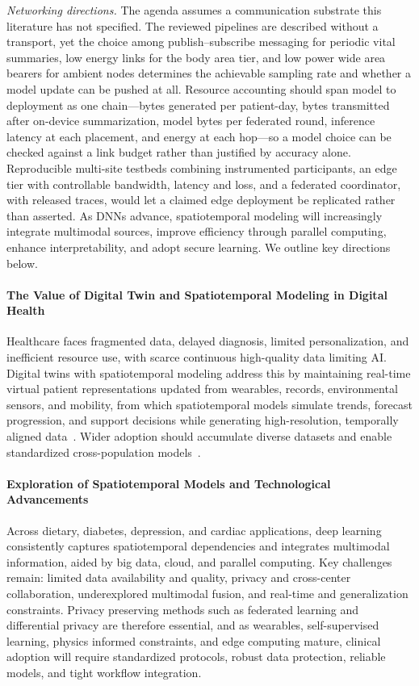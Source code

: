 \documentclass[journal]{IEEEtran}
\begin{document}
\emph{Networking directions.} The agenda assumes a communication substrate this literature has not specified. The reviewed pipelines are described without a transport, yet the choice among publish--subscribe messaging for periodic vital summaries, low energy links for the body area tier, and low power wide area bearers for ambient nodes determines the achievable sampling rate and whether a model update can be pushed at all. Resource accounting should span model to deployment as one chain---bytes generated per patient-day, bytes transmitted after on-device summarization, model bytes per federated round, inference latency at each placement, and energy at each hop---so a model choice can be checked against a link budget rather than justified by accuracy alone. Reproducible multi-site testbeds combining instrumented participants, an edge tier with controllable bandwidth, latency and loss, and a federated coordinator, with released traces, would let a claimed edge deployment be replicated rather than asserted.
\else
As DNNs advance, spatiotemporal modeling will increasingly integrate multimodal sources, improve efficiency through parallel computing, enhance interpretability, and adopt secure learning. We outline key directions below.
\paragraph{The Value of Digital Twin and Spatiotemporal Modeling in Digital Health}

Healthcare faces fragmented data, delayed diagnosis, limited personalization, and inefficient resource use, with scarce continuous high-quality data limiting AI. Digital twins with spatiotemporal modeling address this by maintaining real-time virtual patient representations updated from wearables, records, environmental sensors, and mobility, from which spatiotemporal models simulate trends, forecast progression, and support decisions while generating high-resolution, temporally aligned data~\cite{ali2024spatialtwins}. Wider adoption should accumulate diverse datasets and enable standardized cross-population models~\cite{bilal2025cityseircast}.

\paragraph{Exploration of Spatiotemporal Models and Technological Advancements}

Across dietary, diabetes, depression, and cardiac applications, deep learning consistently captures spatiotemporal dependencies and integrates multimodal information, aided by big data, cloud, and parallel computing. Key challenges remain: limited data availability and quality, privacy and cross-center collaboration, underexplored multimodal fusion, and real-time and generalization constraints. Privacy preserving methods such as federated learning and differential privacy are therefore essential, and as wearables, self-supervised learning, physics informed constraints, and edge computing mature, clinical adoption will require standardized protocols, robust data protection, reliable models, and tight workflow integration.
\end{document}
